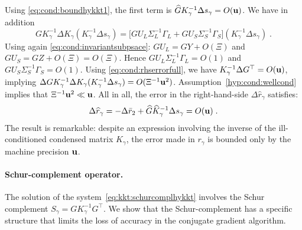 Using \eqref{eq:cond:boundhykkt1}, the first term is $\widehat{G} K_\gamma^{-1} \Delta s_\gamma = O(\mathbf{u})$.
We have in addition
\begin{equation}
  G K_\gamma^{-1}\Delta K_\gamma (K_\gamma^{-1} \Delta s_\gamma)  =
  \big[ G U_L \Sigma_L^{-1} \Gamma_L + G U_S \Sigma_S^{-1} \Gamma_S \big] (K_\gamma^{-1} \Delta s_\gamma) \; .
\end{equation}
Using again \eqref{eq:cond:invariantsubpsace}:
$G U_L = G Y + O(\Xi)$ and $G U_S = GZ + O(\Xi) = O(\Xi)$. Hence
$G U_L \Sigma_L^{-1} \Gamma_L = O(1)$ and $G U_S \Sigma_S^{-1} \Gamma_S = O(1)$.
Using \eqref{eq:cond:rhserrorfull}, we have $K_\gamma^{-1} \Delta G^\top = O(\mathbf{u})$,
implying $\Delta G K_\gamma^{-1} \Delta K_\gamma (K_\gamma^{-1} \Delta s_\gamma) = O(\Xi^{-1} \mathbf{u}^{2})$.
Assumption~\ref{hyp:cond:wellcond} implies that $\Xi^{-1} \mathbf{u}^2 \ll \mathbf{u}$.
All in all, the error in the right-hand-side $\Delta \widehat{r}_\gamma$ satisfies:
\begin{equation}
  \label{eq:cond:errorrgamma}
  \Delta \widehat{r}_\gamma = -\Delta \bar{r}_2 + \widehat{G} \widehat{K}_\gamma^{-1} \Delta s_\gamma = O(\mathbf{u}) \;.
\end{equation}
The result is remarkable: despite an expression involving the inverse
of the ill-conditioned condensed matrix $K_\gamma$, the error made in $r_\gamma$
is bounded only by the machine precision $\mathbf{u}$.

\paragraph{Schur-complement operator.}
The solution of the system~\eqref{eq:kkt:schurcomplhykkt}
involves the Schur complement $S_\gamma = G K_\gamma^{-1} G^\top$.
We show that the Schur-complement
has a specific structure that limits the loss of accuracy
in the conjugate gradient algorithm.

